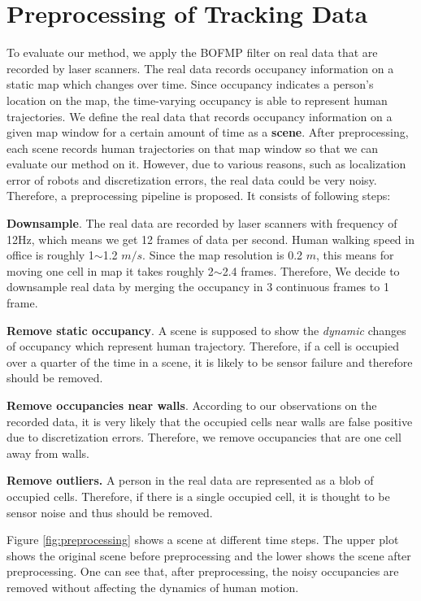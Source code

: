 \newpage
\section{Preprocessing of Tracking Data} \label{sec:preprocessing}

To evaluate our method, we apply the BOFMP filter on real data that are recorded by laser scanners. The real data records occupancy information on a static map which changes over time. Since occupancy indicates a person's location on the map, the time-varying occupancy is able to represent human trajectories. We define the real data that records occupancy information on a given map window for a certain amount of time as a \textbf{scene}. After preprocessing, each scene records human trajectories on that map window so that we can evaluate our method on it. However, due to various reasons, such as localization error of robots and discretization errors, the real data could be very noisy. Therefore, a preprocessing pipeline is proposed. It consists of following steps:

\begin{my_enumerate}
\item \textbf{Downsample}. The real data are recorded by laser scanners with frequency of 12Hz, which means we get 12 frames of data per second. Human walking speed in office is roughly 1$\sim$1.2 $m/s$. Since the map resolution is 0.2 $m$, this means for moving one cell in map it takes roughly 2$\sim$2.4 frames. Therefore, We decide to downsample real data by merging the occupancy in 3 continuous frames to 1 frame.
\item \textbf{Remove static occupancy}. A scene is supposed to show the \textit{dynamic} changes of occupancy which represent human trajectory. Therefore, if a cell is occupied over a quarter of the time in a scene, it is likely to be sensor failure and therefore should be removed. 
\item \textbf{Remove occupancies near walls}. According to our observations on the recorded data, it is very likely that the occupied cells near walls are false positive due to discretization errors. Therefore, we remove occupancies that are one cell away from walls. 
\item \textbf{Remove outliers.} A person in the real data are represented as a blob of occupied cells. Therefore, if there is a single occupied cell, it is thought to be sensor noise and thus should be removed.
\end{my_enumerate}

Figure \ref{fig:preprocessing} shows a scene at different time steps. The upper plot shows the original scene before preprocessing and the lower shows the scene after preprocessing. One can see that, after preprocessing, the noisy occupancies are removed without affecting the dynamics of human motion.

